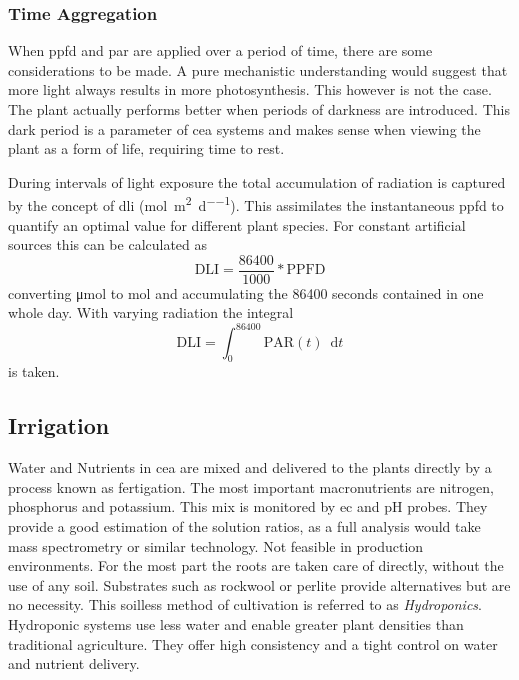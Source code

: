 
\subsubsection{Time Aggregation}
When \ac{ppfd} and \ac{par} are applied over a period of time, there are some considerations to be made.
A pure mechanistic understanding would suggest that more light always results in more photosynthesis.
This however is not the case.
The plant actually performs better when periods of darkness are introduced.
This dark period is a parameter of \ac{cea} systems and makes sense when viewing the plant as a form of life, requiring time to rest.

During intervals of light exposure the total accumulation of radiation is captured by the concept of \ac{dli} (\si{\mol\per\square\m\per\day}).
This assimilates the instantaneous \ac{ppfd} to quantify an optimal value for different plant species.
For constant artificial sources this can be calculated as
$$
\text{DLI} = \frac{86400}{1000} * \text{PPFD}
$$
converting \si{\umol} to \si{\mol} and accumulating the 86400 seconds contained in one whole day.
With varying radiation the integral
$$
\text{DLI} = \int_0^{86400} \text{PAR}(t) \enspace \mathrm{d}t
$$
is taken.


\subsection{Irrigation}
\label{sub:fund-cea-irr}
Water and Nutrients in \ac{cea} are mixed and delivered to the plants directly by a process known as fertigation.
The most important macronutrients are nitrogen, phosphorus and potassium.
This mix is monitored by \ac{ec} and pH probes.
They provide a good estimation of the solution ratios, as a full analysis would take mass spectrometry or similar technology.
Not feasible in production environments.
For the most part the roots are taken care of directly, without the use of any soil.
Substrates such as rockwool or perlite provide alternatives but are no necessity.
This soilless method of cultivation is referred to as \textit{Hydroponics}.
Hydroponic systems use less water and enable greater plant densities than traditional agriculture.
They offer high consistency and a tight control on water and nutrient delivery.

